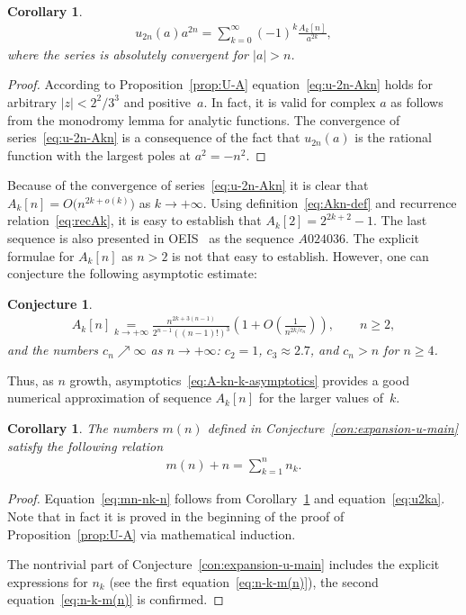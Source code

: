 \documentclass[pdftex]{sigma}
\numberwithin{equation}{section}
\newtheorem{Corollary}[Theorem]{Corollary}
\newtheorem{Conjecture}[Theorem]{Conjecture}
\begin{document}
\begin{Corollary}\label{cor:u-2n-Akn}
\begin{gather}\label{eq:u-2n-Akn}
u_{2n}(a)a^{2n}=\sum\limits_{k=0}^{\infty}(-1)^k\frac{A_k[n]}{a^{2k}},
\end{gather}
where the series is absolutely convergent for $|a|>n$.
\end{Corollary}
\begin{proof}
According to Proposition~\ref{prop:U-A} equation~\eqref{eq:u-2n-Akn} holds
for arbitrary $|z|<2^2/3^3$ and posi\-tive~$a$. In fact, it is valid for complex $a$ as follows from the monodromy lemma for
analytic functions.
The convergence of series~\eqref{eq:u-2n-Akn} is a consequence of the fact that $u_{2n}(a)$ is the rational function with
the largest poles at $a^2=-n^2$.
\end{proof}
\begin{Remark}Because of the convergence of series~\eqref{eq:u-2n-Akn} it is clear that $A_k[n] = O \big(n^{2k+o(k)} \big)$
as $k\to+\infty$.
Using definition~\eqref{eq:Akn-def} and recurrence relation~\eqref{eq:recAk}, it is easy to establish that $A_k[2]=2^{2k+2}-1$.
The last sequence is also presented in OEIS~\cite{OEIS} as the sequence $A024036$. The explicit formulae for $A_k[n]$ as $n>2$
is not that easy to establish. However, one can conjecture the following asymptotic estimate:
\begin{Conjecture}\label{con:A-kn-k-asymptotics}
\begin{gather}\label{eq:A-kn-k-asymptotics}
A_k[n]\underset{k\to+\infty}=\frac{n^{2k+3(n-1)}}{2^{n-1}\left((n-1)!\right)^3}
\left(1+O\left(\frac1{n^{2k/c_n}}\right)\right), \qquad n\geq2,
\end{gather}
and the numbers $c_n\nearrow\infty$ as $n\to+\infty$: $c_2=1$, $c_3\approx2.7$, and $c_n>n$ for $n\geq4$.
\end{Conjecture}
Thus, as $n$ growth, asymptotics~\eqref{eq:A-kn-k-asymptotics} provides a good numerical approximation of sequence
$A_k[n]$ for the larger values of~$k$.
\end{Remark}
\begin{Corollary}\label{cor:mn-sum-nk-n}
The numbers $m(n)$ defined in Conjecture~{\rm \ref{con:expansion-u-main}} satisfy the following relation
\begin{gather}\label{eq:mn-nk-n}
m(n)+n=\sum\limits_{k=1}^n n_k.
\end{gather}
\end{Corollary}
\begin{proof}
Equation~\eqref{eq:mn-nk-n} follows from Corollary~\ref{cor:u-2n-Akn} and equation~\eqref{eq:u2ka}. Note that
in fact it is proved in the beginning of the proof of Proposition~\ref{prop:U-A} via mathematical induction.

The nontrivial part of Conjecture~\ref{con:expansion-u-main} includes the explicit
expressions for $n_k$ (see the first equation~\eqref{eq:n-k-m(n)}), the second equation~\eqref{eq:n-k-m(n)}
is confirmed.
\end{proof}
\end{document}

